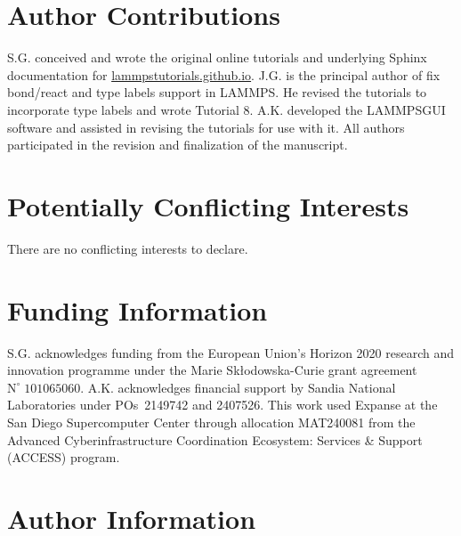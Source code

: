 \documentclass[9pt,tutorial]{livecoms}
\newcommand{\lmpcmd}[1]{\colorbox{listing}{\textcolor{command}{\small{#1}}}} %
\newcommand{\lammpsgui}{\textsf{LAMMPS\textendash GUI}}
\begin{document}
\section*{Author Contributions}

S.G. conceived and wrote the original online tutorials and underlying Sphinx documentation
for \href{https://lammpstutorials.github.io}{lammpstutorials.github.io}.
J.G. is the principal author of \lmpcmd{fix bond/react} and \lmpcmd{type labels}
support in LAMMPS.  He revised the tutorials to incorporate type labels and wrote Tutorial 8.
A.K. developed the \lammpsgui{} software and assisted in revising the
tutorials for use with it.  All authors participated in the revision and finalization
of the manuscript.

\section*{Potentially Conflicting Interests}

There are no conflicting interests to declare.

\section*{Funding Information}

S.G. acknowledges funding from the European Union's Horizon 2020 research and
innovation programme under the Marie Skłodowska-Curie grant agreement $\text{N}^\circ\;101065060$.
A.K. acknowledges financial support by Sandia National Laboratories under
POs~2149742 and 2407526. {\color{blue}This work used Expanse at the San Diego Supercomputer
Center through allocation MAT240081 from the Advanced Cyberinfrastructure Coordination
Ecosystem: Services \& Support (ACCESS) program.}

\section*{Author Information}
\makeorcid



\end{document}
